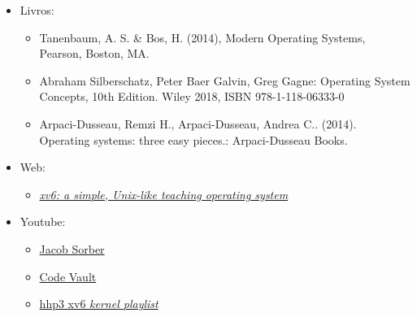 \documentclass{article}
\begin{document}
\begin{itemize}
      \item Livros:
            \begin{itemize}
                  \item Tanenbaum, A. S. \& Bos, H. (2014), Modern Operating
                        Systems, Pearson, Boston, MA.
                  \item Abraham Silberschatz, Peter Baer Galvin, Greg Gagne:
                        Operating System Concepts, 10th Edition. Wiley 2018,
                        ISBN
                        978-1-118-06333-0
                  \item Arpaci-Dusseau, Remzi H., Arpaci-Dusseau, Andrea C..
                        (2014).
                        Operating systems: three easy pieces.: Arpaci-Dusseau
                        Books.
            \end{itemize}

      \item Web:
            \begin{itemize}
                  \item

                        \href{https://pdos.csail.mit.edu/6.828/2023/xv6/book-riscv-rev3.pdf}{\textit{xv6:
                                    a
                                    simple, Unix-like teaching operating
                                    system}}
            \end{itemize}

      \item Youtube:
            \begin{itemize}
                  \item \href{https://www.youtube.com/@JacobSorber}{Jacob
                              Sorber}
                  \item \href{https://www.youtube.com/@CodeVault}{Code Vault}
                  \item

                        \href{https://www.youtube.com/watch?v=fWUJKH0RNFE&list=PLbtzT1TYeoMhTPzyTZboW_j7TPAnjv9XB}{hhp3
                              xv6 \textit{kernel playlist}}
            \end{itemize}

\end{itemize}
\end{document}
